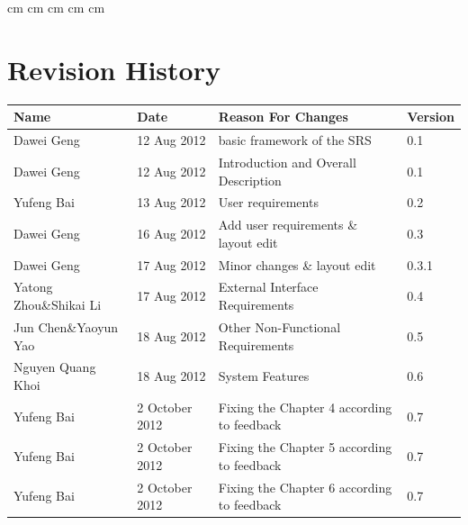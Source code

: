 \documentclass[11pt, a4paper]{report}
\begin{document}
 cm
 cm
 cm
 cm
 cm

\tableofcontents






\clearpage
\section*{Revision History}
\begin{tabular}{| l | l | l | l | }
\hline
Name                        &   Date        	    &	Reason For Changes                  	         	&	Version     	\\ \hline
Dawei Geng                  & 	12 Aug 2012    	    & 	basic framework of the SRS     			    	    &	0.1             \\ \hline
Dawei Geng                  &	12 Aug 2012    	    & 	Introduction and Overall Description             	&	0.1             \\ \hline
Yufeng Bai                  &	13 Aug 2012 	    &	User requirements 						         	&	0.2  			\\ \hline
Dawei Geng                  &	16 Aug 2012		    &	Add user requirements \& layout edit	          	&	0.3 			\\ \hline
Dawei Geng                  &	17 Aug 2012         &	Minor changes \& layout edit			        	&	0.3.1 			\\ \hline
Yatong Zhou\&Shikai Li      &	17 Aug 2012		    &		External Interface Requirements 				&	0.4				\\ \hline
Jun Chen\&Yaoyun Yao		&	18 Aug 2012		    &		Other Non-Functional Requirements				&	0.5				\\ \hline
Nguyen Quang Khoi			&	18 Aug 2012		    &		System Features			                    	&	0.6				\\ \hline
Yufeng Bai		            &	2 October 2012		&	Fixing the Chapter 4 according to feedback	     	&	0.7				\\ \hline
Yufeng Bai		            &	2 October 2012		&	Fixing the Chapter 5 according to feedback	        &	0.7				\\ \hline
Yufeng Bai		            &	2 October 2012		&	Fixing the Chapter 6 according to feedback	        &	0.7				\\ \hline

\end{tabular}
\end{document}
